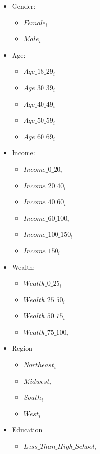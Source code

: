 \documentclass[11pt]{article}
\begin{document}
\begin{itemize}
    \item Gender: 
    \begin{itemize}
        \item $Female_i$
        \item $Male_i$
    \end{itemize}
    \item Age:
    \begin{itemize}
        \item $Age\_18\_29_i$
        \item $Age\_30\_39_i$
        \item $Age\_40\_49_i$
        \item $Age\_50\_59_i$
        \item $Age\_60\_69_i$
    \end{itemize}
    \item Income:
    \begin{itemize}
        \item $Income\_0\_20_i$
        \item $Income\_20\_40_i$
        \item $Income\_40\_60_i$
        \item $Income\_60\_100_i$
        \item $Income\_100\_150_i$
        \item $Income\_150_i$
    \end{itemize}
    \item Wealth:
    \begin{itemize}
        \item $Wealth\_0\_25_i$ 
        \item $Wealth\_25\_50_i$
        \item $Wealth\_50\_75_i$
        \item $Wealth\_75\_100_i$
    \end{itemize}
    \item Region
        \begin{itemize}
            \item $Northeast_i$
            \item $Midwest_i$
            \item $South_i$
            \item $West_i$
        \end{itemize}
    \item Education
    \begin{itemize}
        \item $Less\_Than\_High\_School_i$

\end{itemize}
\end{itemize}
\end{document}
